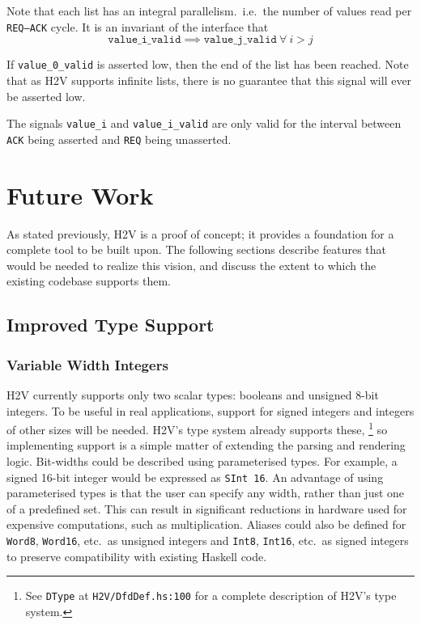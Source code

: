 \documentclass[english,onecolumn]{scrartcl}
\begin{document}
Note that each list has an integral parallelism.\ i.e.\ the number of values read per \texttt{REQ--ACK} cycle.
It is an invariant of the interface that
\[ \texttt{value\_i\_valid} \implies \texttt{value\_j\_valid}\ \forall\ i > j \]

If \texttt{value\_0\_valid} is asserted low, then the end of the list has been reached. Note that as H2V supports infinite lists,
there is no guarantee that this signal will ever be asserted low.

The signals \texttt{value\_i} and \texttt{value\_i\_valid} are only valid
for the interval between \texttt{ACK} being asserted and \texttt{REQ} being unasserted.


\pagebreak{}
\section{Future Work}
As stated previously, H2V is a proof of concept; it provides a foundation for a complete tool to be built upon.
The following sections describe features that would be needed to realize this vision, and discuss the extent to which the existing
codebase supports them.

\subsection{Improved Type Support}
\subsubsection{Variable Width Integers}
H2V currently supports only two scalar types: booleans and unsigned 8-bit integers. To be useful in real applications,
support for signed integers and integers of other sizes will be needed. H2V's type system already supports these,%
\footnote{See \texttt{DType} at \texttt{H2V/DfdDef.hs:100} for a complete description of H2V's type system.}
so implementing support is a simple matter of extending the parsing and rendering logic.
Bit-widths could be described using parameterised types. For example, a signed 16-bit integer would be expressed as
\texttt{SInt 16}. An advantage of using parameterised types is that the user can specify any width, rather than just
one of a predefined set. This can result in significant reductions in hardware used for expensive computations, such as
multiplication. Aliases could also be defined for \texttt{Word8}, \texttt{Word16}, etc.\ as unsigned integers and \texttt{Int8},
\texttt{Int16}, etc.\ as signed integers to preserve compatibility with existing Haskell code.
\end{document}

